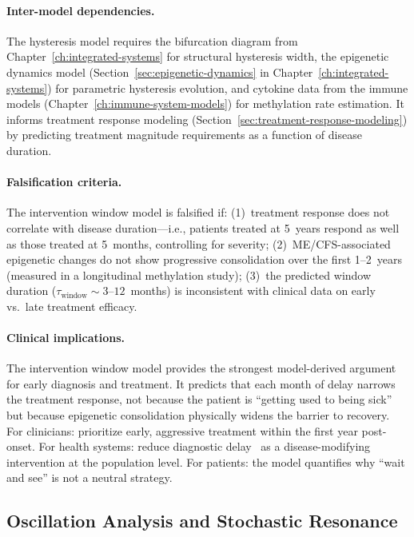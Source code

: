 \paragraph{Inter-model dependencies.}
The hysteresis model requires the bifurcation diagram from Chapter~\ref{ch:integrated-systems} for structural hysteresis width, the epigenetic dynamics model (Section~\ref{sec:epigenetic-dynamics} in Chapter~\ref{ch:integrated-systems}) for parametric hysteresis evolution, and cytokine data from the immune models (Chapter~\ref{ch:immune-system-models}) for methylation rate estimation. It informs treatment response modeling (Section~\ref{sec:treatment-response-modeling}) by predicting treatment magnitude requirements as a function of disease duration.

\paragraph{Falsification criteria.}
The intervention window model is falsified if: (1)~treatment response does not correlate with disease duration---i.e., patients treated at 5~years respond as well as those treated at 5~months, controlling for severity; (2)~ME/CFS-associated epigenetic changes do not show progressive consolidation over the first 1--2~years (measured in a longitudinal methylation study); (3)~the predicted window duration ($\tau_{\text{window}} \sim 3$--$12$~months) is inconsistent with clinical data on early vs.\ late treatment efficacy.

\paragraph{Clinical implications.}
The intervention window model provides the strongest model-derived argument for early diagnosis and treatment. It predicts that each month of delay narrows the treatment response, not because the patient is ``getting used to being sick'' but because epigenetic consolidation physically widens the barrier to recovery. For clinicians: prioritize early, aggressive treatment within the first year post-onset. For health systems: reduce diagnostic delay~\cite{CastroMarrero2022prognosis} as a disease-modifying intervention at the population level. For patients: the model quantifies why ``wait and see'' is not a neutral strategy.

\subsection{Oscillation Analysis and Stochastic Resonance}

